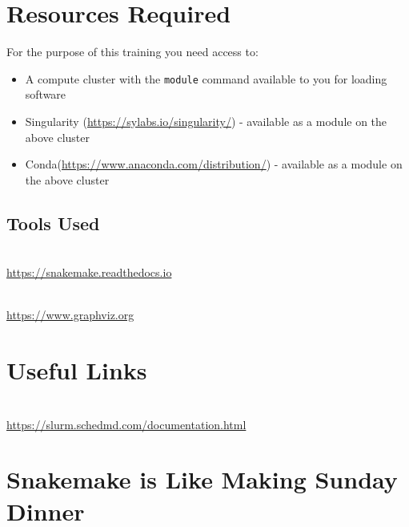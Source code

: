 \section{Resources Required}

For the purpose of this training you need access to:

\begin{itemize}
  \item A compute cluster with the \texttt{module} command available to you for loading software
  \item Singularity (\url{https://sylabs.io/singularity/}) - available as a module on the above cluster
  \item Conda(\url{https://www.anaconda.com/distribution/}) - available as a module on the above cluster
\end{itemize}


\subsection{Tools Used}
\begin{description}[style=multiline,labelindent=0cm,align=left,leftmargin=0.5cm]
  \item[Snakemake]\hfill\\
    \url{https://snakemake.readthedocs.io}
  \item[Graphviz]\hfill\\
    \url{https://www.graphviz.org}
\end{description}

\section{Useful Links}
 
\begin{description}[style=multiline,labelindent=0cm,align=left,leftmargin=0.5cm]
  \item[Slurm Documentation]\hfill\\
    \url{https://slurm.schedmd.com/documentation.html}
\end{description}

\newpage

\section{Snakemake is Like Making Sunday Dinner}

